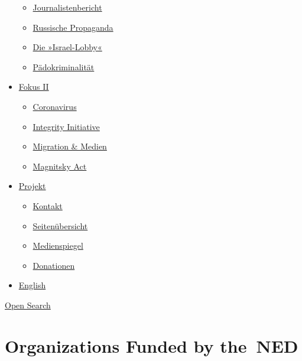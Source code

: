 \begin{itemize}
  \begin{itemize}
  \tightlist
  \item
    \href{https://swprs.org/bericht-eines-journalisten/}{Journalistenbericht}
  \item
    \href{https://swprs.org/russische-propaganda/}{Russische Propaganda}
  \item
    \href{https://swprs.org/die-israel-lobby-fakten-und-mythen/}{Die
    »Israel-Lobby«}
  \item
    \href{https://swprs.org/geopolitik-und-paedokriminalitaet/}{Pädokriminalität}
  \end{itemize}
\item
  \href{https://swprs.org/migration-und-medien/}{Fokus II}

  \begin{itemize}
  \tightlist
  \item
    \href{https://swprs.org/covid-19-hinweis-ii/}{Coronavirus}
  \item
    \href{https://swprs.org/die-integrity-initiative/}{Integrity
    Initiative}
  \item
    \href{https://swprs.org/migration-und-medien/}{Migration \& Medien}
  \item
    \href{https://swprs.org/der-fall-magnitsky/}{Magnitsky Act}
  \end{itemize}
\item
  \href{https://swprs.org/kontakt/}{Projekt}

  \begin{itemize}
  \tightlist
  \item
    \href{https://swprs.org/kontakt/}{Kontakt}
  \item
    \href{https://swprs.org/uebersicht/}{Seitenübersicht}
  \item
    \href{https://swprs.org/medienspiegel/}{Medienspiegel}
  \item
    \href{https://swprs.org/donationen/}{Donationen}
  \end{itemize}
\item
  \href{https://swprs.org/contact/}{English}
\end{itemize}

\protect\hyperlink{}{Open Search}

\hypertarget{organizations-funded-by-the-ned}{%
\section{Organizations Funded by
the~NED}\label{organizations-funded-by-the-ned}}

